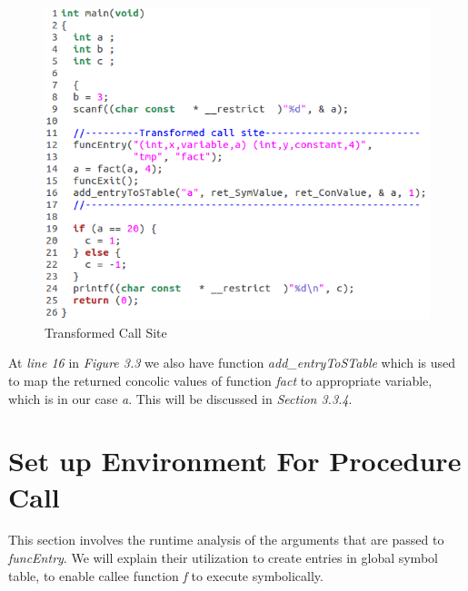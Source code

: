 \documentclass[12pt,oneside]{book}
\begin{document}
\vspace{0.4cm}
\begin{figure}[htbp]
\centering
\includegraphics[scale=0.56]{env2_modified.png}
\caption{Transformed Call Site}
\end{figure}  

At \textit{line 16} in \textit{Figure 3.3} we also have function \textit{add\_entryToSTable} which is used to map the returned concolic values of function \textit{fact} to appropriate variable, which is in our case \textit{a}. This will be discussed in \textit{Section 3.3.4}. 

\newpage

\section{Set up Environment For Procedure Call}
This section involves the runtime analysis of the arguments that are passed to \textit{funcEntry}. We will explain their utilization to create entries in global symbol table, to enable callee function \textit{f} to execute symbolically.
\end{document}
